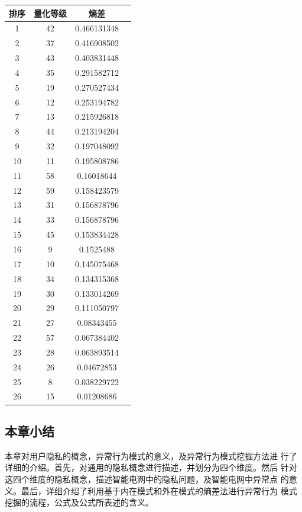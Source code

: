 \documentclass[10.5pt,twocolumn]{jbuaa}
\begin{document}
\begin{table}[htbp]
\centering
\captionnamefont{\xiaowuhao\bf }
\captiontitlefont{\xiaowuhao\bf }
\renewcommand\tabcolsep{1em}
\begin{tabular}{cccc}
\toprule
{排序} &  {量化等级} & {熵差}\\
\midrule
1 & 42 & 0.466131348\\
2 & 37 & 0.416908502\\
3 & 43 & 0.403831448\\
4 & 35 & 0.291582712\\
5 & 19 & 0.270527434\\
6 & 12 & 0.253194782\\
7 & 13 & 0.215926818\\
8 & 44 & 0.213194204\\
9 & 32 & 0.197048092\\
10 & 11 & 0.195808786\\
11 & 58 & 0.16018644\\
12 & 59 & 0.158423579\\
13 & 31 & 0.156878796\\
14 & 33 & 0.156878796\\
15 & 45 & 0.153834428\\
16 & 9 & 0.1525488\\
17 & 10 & 0.145075468\\
18 & 34 & 0.134315368\\
19 & 30 & 0.133014269\\
20 & 29 & 0.111050797\\
21 & 27 & 0.08343455\\
22 & 57 & 0.067384402\\
23 & 28 & 0.063893514\\
24 & 26 & 0.04672853\\
25 & 8 & 0.038229722\\
26 & 15 & 0.01208686\\
\bottomrule
\end{tabular}
\end{table}

\subsection{本章小结}
本章对用户隐私的概念，异常行为模式的意义，及异常行为模式挖掘方法进
行了详细的介绍。首先，对通用的隐私概念进行描述，并划分为四个维度。然后
针对这四个维度的隐私概念，描述智能电网中的隐私问题，及智能电网中异常点
的意义。最后，详细介绍了利用基于内在模式和外在模式的熵差法进行异常行为
模式挖掘的流程，公式及公式所表述的含义。
\end{document}
